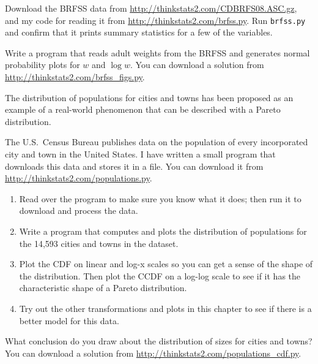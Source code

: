 \documentclass[12pt]{book}
\begin{document}
\begin{exercise}
Download the BRFSS data from 
\url{http://thinkstats2.com/CDBRFS08.ASC.gz}, and my code for reading it
from
\url{http://thinkstats2.com/brfss.py}.  Run {\tt brfss.py} and confirm that
it prints summary statistics for a few of the variables.

Write a program that reads adult weights from the BRFSS and
generates normal probability plots for $w$ and $\log w$.  You can
download a solution from \url{http://thinkstats2.com/brfss_figs.py}.

\end{exercise}

\begin{exercise}
The distribution of populations for cities and towns has been proposed
as an example of a real-world phenomenon that can be described
with a Pareto distribution.

The U.S.~Census Bureau publishes data on the population of every
incorporated city and town in the United States.  I have written a
small program that downloads this data and stores it in a file.  You
can download it from \url{http://thinkstats2.com/populations.py}.

\begin{enumerate}

\item Read over the program to make sure you know what it does; then
  run it to download and process the data.

\item Write a program that computes and plots the distribution of
  populations for the 14,593 cities and towns in the dataset.

\item Plot the CDF on linear and log-x scales so you can get a sense
  of the shape of the distribution.  Then plot the CCDF on a log-log
  scale to see if it has the characteristic shape of a Pareto
  distribution.

\item Try out the other transformations and plots in this chapter to
  see if there is a better model for this data.

\end{enumerate}

What conclusion do you draw about the distribution of sizes
for cities and towns?  You can download a solution from
\url{http://thinkstats2.com/populations_cdf.py}.

\end{exercise}
\end{document}
